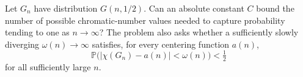 Let $G_n$ have distribution $G(n,1/2)$. Can an absolute constant $C$ bound the number of possible chromatic-number values needed to capture probability tending to one as $n\to\infty$? The problem also asks whether a sufficiently slowly diverging $\omega(n)\to\infty$ satisfies, for every centering function $a(n)$,
\[
\mathbb P\bigl(|\chi(G_n)-a(n)|<\omega(n)\bigr)<\tfrac12
\]
for all sufficiently large $n$.
